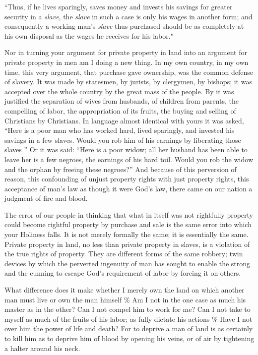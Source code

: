 \documentclass{book}
\begin{document}
“Thus, if he lives sparingly, saves money and invests his savings for greater security in a \emph{slave}, the \emph{slave} in such a case is only his wages in another form; and consequently a working-man’s \emph{slave} thus purchased should be as completely at his own disposal as the wages he receives for his labor."

Nor in turning your argument for private property in land into an argument for private property in men am I doing a new thing. In my own country, in my own time, this very argument, that purchase gave ownership, was the common defense of slavery. It was made by statesmen, by jurists, by clergymen, by bishops; it was accepted over the whole country by the great mass of the people. By it was justified the separation of wives from husbands, of children from parents, the compelling of labor, the appropriation of its fruits, the buying and selling of Christians by Christians. In language almost identical with yours it was asked, “Here is a poor man who has worked hard, lived sparingly, and invested his savings in a few slaves. Would you rob him of his earnings by liberating those slaves ” Or it was said: “Here is a poor widow; all her husband has been able to leave her is a few negroes, the earnings of his hard toil. Would you rob the widow and the orphan by freeing these negroes?” And because of this perversion of reason, this confounding of unjust property rights with just property rights, this acceptance of man’s law as though it were God’s law, there came on our nation a judgment of fire and blood.

The error of our people in thinking that what in itself was not rightfully property could become rightful property by purchase and sale is the same error into which your Holiness falls. It is not merely formally the same; it is essentially the same. Private property in land, no less than private property in slaves, is a violation of the true rights of property. They are different forms of the same robbery; twin devices by which the perverted ingenuity of man has sought to enable the strong and the cunning to escape God’s requirement of labor by forcing it on others.

What difference does it make whether I merely own the land on which another man must live or own the man himself \% Am I not in the one case as much his master as in the other? Can I not compel him to work for me? Can I not take to myself as much of the fruits of his labor; as fully dictate his actions \% Have I not over him the power of life and death? For to deprive a man of land is as certainly to kill him as to deprive him of blood by opening his veins, or of air by tightening a halter around his neck.
\end{document}
